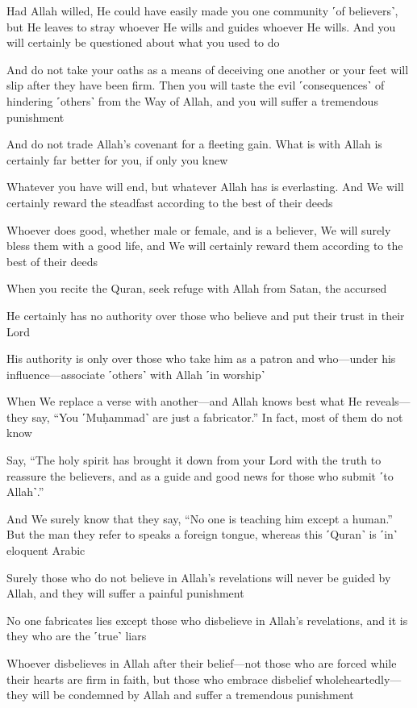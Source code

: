 Had Allah willed, He could have easily made you one community ˹of believers˺, but He leaves to stray whoever He wills and guides whoever He wills. And you will certainly be questioned about what you used to do

And do not take your oaths as a means of deceiving one another or your feet will slip after they have been firm. Then you will taste the evil ˹consequences˺ of hindering ˹others˺ from the Way of Allah, and you will suffer a tremendous punishment

And do not trade Allah’s covenant for a fleeting gain. What is with Allah is certainly far better for you, if only you knew

Whatever you have will end, but whatever Allah has is everlasting. And We will certainly reward the steadfast according to the best of their deeds

Whoever does good, whether male or female, and is a believer, We will surely bless them with a good life, and We will certainly reward them according to the best of their deeds

When you recite the Quran, seek refuge with Allah from Satan, the accursed

He certainly has no authority over those who believe and put their trust in their Lord

His authority is only over those who take him as a patron and who—under his influence—associate ˹others˺ with Allah ˹in worship˺

When We replace a verse with another—and Allah knows best what He reveals—they say, “You ˹Muḥammad˺ are just a fabricator.” In fact, most of them do not know

Say, “The holy spirit has brought it down from your Lord with the truth to reassure the believers, and as a guide and good news for those who submit ˹to Allah˺.”

And We surely know that they say, “No one is teaching him except a human.” But the man they refer to speaks a foreign tongue, whereas this ˹Quran˺ is ˹in˺ eloquent Arabic

Surely those who do not believe in Allah’s revelations will never be guided by Allah, and they will suffer a painful punishment

No one fabricates lies except those who disbelieve in Allah’s revelations, and it is they who are the ˹true˺ liars

Whoever disbelieves in Allah after their belief—not those who are forced while their hearts are firm in faith, but those who embrace disbelief wholeheartedly—they will be condemned by Allah and suffer a tremendous punishment

